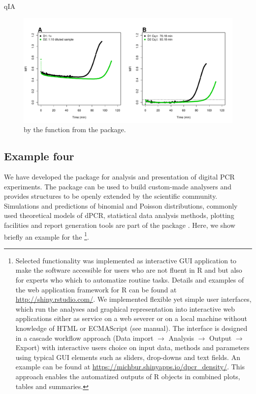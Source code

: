 qIA

\begin{figure}[htbp]
  \centering
  \includegraphics[clip=true, width=16cm]{figures/qIA.pdf}
  \caption{by the  function from the  package.}
  \label{figure:qIA}
\end{figure}


\subsection{Example four}

We have developed the  package for analysis and presentation of 
digital PCR experiments. The  package can be used to build 
custom-made analysers and provides structures to be openly extended by the 
scientific community. Simulations and predictions of binomial and Poisson 
distributions, commonly used theoretical models of dPCR, statistical data 
analysis methods, plotting facilities and report generation tools are part of 
the package \citep{pabinger_2014}. Here, we show briefly an example for the 
\footnote{Selected functionality was implemented as 
interactive GUI application to make the software accessible for 
users who are not fluent in R and but also for experts who which to automatize 
routine tasks. Details and examples of the  web application 
framework for R can be found at \url{http://shiny.rstudio.com/}. We implemented 
flexible yet simple user interfaces, which run the analyses and graphical 
representation into interactive web applications either as service on a web 
severer or on a local machine without knowledge of HTML or ECMAScript (see 
 manual). The interface is designed in a cascade workflow approach 
(Data import $\rightarrow$ Analysis $\rightarrow$ Output $\rightarrow$ Export) 
with interactive users choice on input data, methods and parameters using 
typical GUI elements such as sliders, drop-downs and text fields. An example can 
be found at \url{https://michbur.shinyapps.io/dpcr_density/}. This approach 
enables the automatized outputs of R objects in combined plots, tables and 
summaries.}.

